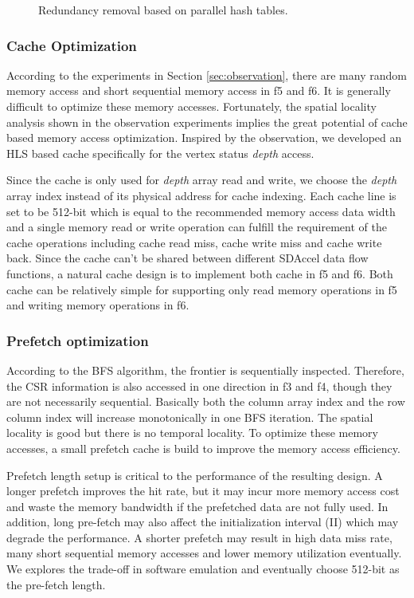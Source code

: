 \begin{figure}
    \caption{Redundancy removal based on parallel hash tables.}
\label{fig:hash-strategy}
\end{figure}

\subsubsection{Cache Optimization}
According to the experiments in Section \ref{sec:observation}, 
there are many random memory access and short 
sequential memory access in f5 and f6. 
It is generally difficult to optimize these memory accesses. Fortunately, 
the spatial locality analysis shown in the observation experiments 
implies the great potential of cache based memory access optimization. 
Inspired by the observation, we developed an HLS based cache specifically 
for the vertex status \textit{depth} access. 

Since the cache is only used for \textit{depth} array read and write, we  
choose the \textit{depth} array index instead of its physical address for cache 
indexing. Each cache line is set to be 512-bit which is equal to the recommended 
memory access data width and a single memory read or write operation can 
fulfill the requirement of the cache operations including cache read miss, 
cache write miss and cache write back. Since the cache can't be shared 
between different SDAccel data flow functions, a natural cache design is 
to implement both cache in f5 and f6. Both cache can be relatively simple 
for supporting only read memory operations in f5 and writing memory operations in f6.  
 
\subsubsection{Prefetch optimization}
According to the BFS algorithm, the frontier is sequentially inspected. 
Therefore, the CSR information is also accessed in one direction 
in f3 and f4, though they are not necessarily sequential. Basically 
both the column array index and the row column index will increase 
monotonically in one BFS iteration. The spatial locality is 
good but there is no temporal locality. To optimize these memory 
accesses, a small prefetch cache 
is build to improve the memory access efficiency. 

Prefetch length setup is critical to the performance of the resulting design.
A longer prefetch improves the hit rate, but it may incur more memory 
access cost and waste the memory bandwidth if the prefetched data are 
not fully used. In addition, long pre-fetch may also affect the 
initialization interval (II) which may degrade the performance. 
A shorter prefetch may result in high data miss rate, many 
short sequential memory accesses and lower memory utilization eventually. 
We explores the trade-off in software emulation and eventually choose 
512-bit as the pre-fetch length.  

